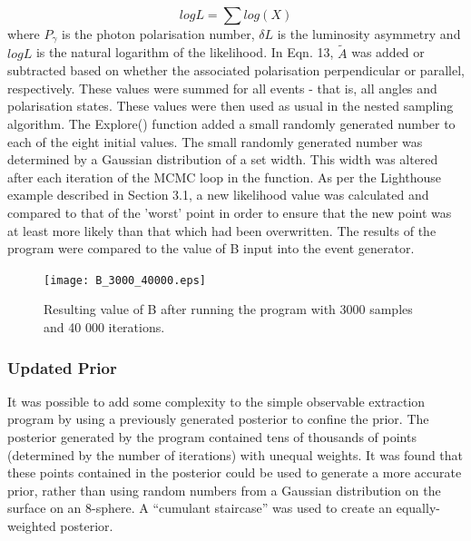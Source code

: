 \documentclass[a4paper,12pt]{article}
\begin{document}
\begin{equation}
logL = \sum log(X)
\end{equation}
where $P_{\gamma}$ is the photon polarisation number, $\delta L$ is the luminosity asymmetry and $logL$ is the natural logarithm of the likelihood.  In Eqn. 13, %
$\tilde{A}$ was added or subtracted based on whether the associated polarisation perpendicular or parallel, respectively.  These values were summed for all events - that is, all angles and polarisation states.  
\newline
These values were then used as usual in the nested sampling algorithm.  The Explore() function added a small randomly generated number to each of the eight initial values.  The small randomly generated number was determined by a Gaussian distribution of a set width.  This width was altered after each iteration of the MCMC loop in the function.  As per the Lighthouse example described in Section 3.1, a new likelihood value was calculated and compared to that of the 'worst' point in order to ensure that the new point was at least more likely than that which had been overwritten.  The results of the program were compared to the value of B input into the event generator.


\begin{figure}[!h]
 \begin{center}
  \texttt{[image: B\_3000\_40000.eps]}
  \caption{Resulting value of B after running the program with 3000 samples and 40 000 iterations.}
 \end{center}
\end{figure}


\subsubsection{Updated Prior}
It was possible to add some complexity to the simple observable extraction program by using a previously generated posterior to confine the prior.  The posterior generated by the program contained tens of thousands of points (determined by the number of iterations) with unequal weights.  It was found that these points contained in the posterior could be used to generate a more accurate prior, rather than using random numbers from a Gaussian distribution on the surface on an 8-sphere.  A ``cumulant staircase'' was used to create an equally-weighted posterior\cite{sivia}.
\end{document}
